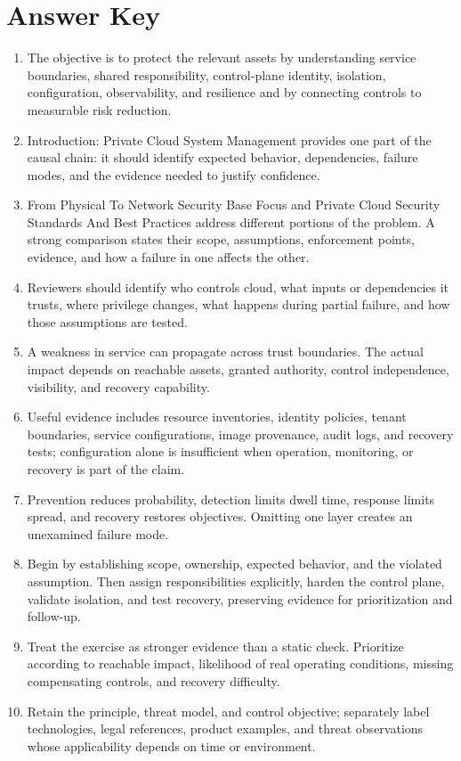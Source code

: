 \documentclass[11pt,letterpaper]{article}
\begin{document}
\section*{Answer Key}
\begin{enumerate}
\item The objective is to protect the relevant assets by understanding service boundaries, shared responsibility, control-plane identity, isolation, configuration, observability, and resilience and by connecting controls to measurable risk reduction.
\item Introduction: Private Cloud System Management provides one part of the causal chain: it should identify expected behavior, dependencies, failure modes, and the evidence needed to justify confidence.
\item From Physical To Network Security Base Focus and Private Cloud Security Standards And Best Practices address different portions of the problem. A strong comparison states their scope, assumptions, enforcement points, evidence, and how a failure in one affects the other.
\item Reviewers should identify who controls cloud, what inputs or dependencies it trusts, where privilege changes, what happens during partial failure, and how those assumptions are tested.
\item A weakness in service can propagate across trust boundaries. The actual impact depends on reachable assets, granted authority, control independence, visibility, and recovery capability.
\item Useful evidence includes resource inventories, identity policies, tenant boundaries, service configurations, image provenance, audit logs, and recovery tests; configuration alone is insufficient when operation, monitoring, or recovery is part of the claim.
\item Prevention reduces probability, detection limits dwell time, response limits spread, and recovery restores objectives. Omitting one layer creates an unexamined failure mode.
\item Begin by establishing scope, ownership, expected behavior, and the violated assumption. Then assign responsibilities explicitly, harden the control plane, validate isolation, and test recovery, preserving evidence for prioritization and follow-up.
\item Treat the exercise as stronger evidence than a static check. Prioritize according to reachable impact, likelihood of real operating conditions, missing compensating controls, and recovery difficulty.
\item Retain the principle, threat model, and control objective; separately label technologies, legal references, product examples, and threat observations whose applicability depends on time or environment.
\end{enumerate}
\end{document}
